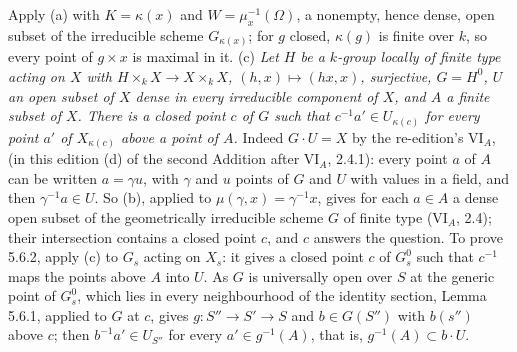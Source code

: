 Apply (a) with \(K=\kappa(x)\) and \(W=\mu_x^{-1}(\Omega)\), a nonempty, hence dense, open subset of the
irreducible scheme \(G_{\kappa(x)}\); for \(g\) closed, \(\kappa(g)\) is finite over \(k\), so every point of
\(g\times x\) is maximal in it.
(c) \emph{Let \(H\) be a \(k\)-group locally of finite type acting on \(X\) with
\(H\times_kX\to X\times_kX\), \((h,x)\mapsto(hx,x)\), surjective, \(G=H^0\), \(U\) an open subset of \(X\) dense in
every irreducible component of \(X\), and \(A\) a finite subset of \(X\). There is a closed point \(c\) of \(G\)
such that \(c^{-1}a'\in U_{\kappa(c)}\) for every point \(a'\) of \(X_{\kappa(c)}\) above a point of \(A\).}
Indeed \(G\cdot U=X\) by the re-edition's VI\(_A\),  (in this edition (d)
of the second Addition after VI\(_A\), 2.4.1): every point \(a\) of \(A\) can be written \(a=\gamma u\),
with \(\gamma\) and \(u\) points of \(G\) and \(U\) with values in a field, and then \(\gamma^{-1}a\in U\). So (b),
applied to \(\mu(\gamma,x)=\gamma^{-1}x\), gives for each \(a\in A\) a dense open subset of the geometrically
irreducible scheme \(G\) of finite type (VI\(_A\), 2.4); their intersection contains a closed point \(c\), and
\(c\) answers the question.
To prove 5.6.2, apply (c) to \(G_s\) acting on \(X_s\): it gives a closed point \(c\) of \(G^0_s\) such that
\(c^{-1}\) maps the points above \(A\) into \(U\). As \(G\) is universally open over \(S\) at the generic point of
\(G^0_s\), which lies in every neighbourhood of the identity section, Lemma 5.6.1, applied to \(G\) at \(c\), gives
\(g\colon S''\to S'\to S\) and \(b\in G(S'')\) with \(b(s'')\) above \(c\); then \(b^{-1}a'\in U_{S''}\) for every
\(a'\in g^{-1}(A)\), that is, \(g^{-1}(A)\subset b\cdot U\).
\par\medskip
